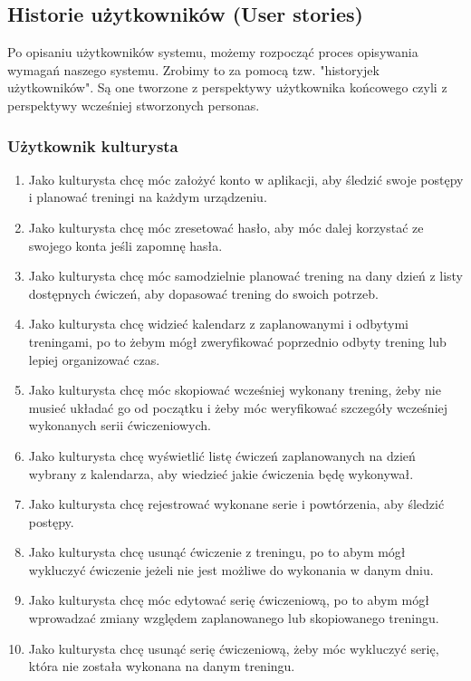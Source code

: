 \documentclass{article}
\begin{document}
      \subsection{Historie użytkowników (User stories)}
            Po opisaniu użytkowników systemu, możemy rozpocząć proces opisywania wymagań naszego systemu. Zrobimy to za pomocą tzw. "historyjek użytkowników". Są one tworzone z perspektywy użytkownika końcowego czyli z perspektywy wcześniej stworzonych personas.
            \subsubsection*{Użytkownik kulturysta}
            \begin{enumerate}
                  \item Jako kulturysta chcę móc założyć konto w aplikacji, aby śledzić swoje postępy i planować treningi na każdym urządzeniu.
                  \item Jako kulturysta chcę móc zresetować hasło, aby móc dalej korzystać ze swojego konta jeśli zapomnę hasła.
                  \item Jako kulturysta chcę móc samodzielnie planować trening na dany dzień z listy dostępnych ćwiczeń, aby dopasować trening do swoich potrzeb.
                  \item Jako kulturysta chcę widzieć kalendarz z zaplanowanymi i odbytymi treningami, po to żebym mógł zweryfikować poprzednio odbyty trening lub lepiej organizować czas.
                  \item Jako kulturysta chcę móc skopiować wcześniej wykonany trening, żeby nie musieć układać go od początku i żeby móc weryfikować szczegóły wcześniej wykonanych serii ćwiczeniowych.
                  \item Jako kulturysta chcę wyświetlić listę ćwiczeń zaplanowanych na dzień wybrany z kalendarza, aby wiedzieć jakie ćwiczenia będę wykonywał.
                  \item Jako kulturysta chcę rejestrować wykonane serie i powtórzenia, aby śledzić postępy.
                  \item Jako kulturysta chcę usunąć ćwiczenie z treningu, po to abym mógł wykluczyć ćwiczenie jeżeli nie jest możliwe do wykonania w danym dniu.
                  \item Jako kulturysta chcę móc edytować serię ćwiczeniową, po to abym mógł wprowadzać zmiany względem zaplanowanego lub skopiowanego treningu.
                  \item Jako kulturysta chcę usunąć serię ćwiczeniową, żeby móc wykluczyć serię, która nie została wykonana na danym treningu.

\end{enumerate}
\end{document}
